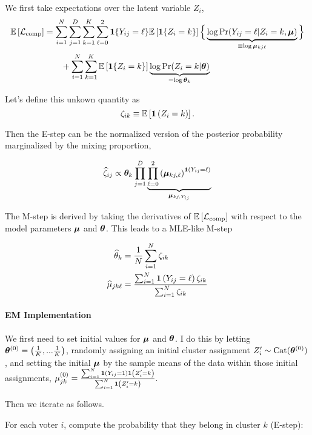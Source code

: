 \documentclass[11pt]{article}
\begin{document}
We first take expectations over the latent variable $Z_{i}$,
\begin{align}
\mathbb{E}\left[\mathcal{L}_{\text{comp}}\right]
& = \sum^{N}_{i=1}\sum^{D}_{j=1}\sum^{K}_{k=1}\sum^{2}_{\ell = 0}
\bm{1}\{Y_{ij} = \ell\} \mathbb{E}\left[\bm{1}\{Z_{i} = k\}\right]\Big\{
\underbrace{\log \Pr(Y_{ij} = \ell | Z_{i} = k, \bm{\mu})}_{\equiv \log\bm{\mu}_{kj\ell}}
\Big\} \nonumber\\
& \qquad +
\sum^{N}_{i=1}\sum^{K}_{k=1}\mathbb{E}\left[\bm{1}\{Z_{i} = k\}\right]\underbrace{\log \Pr(Z_{i} = k | \bm{\theta})}_{= \log \bm{\theta}_{k}}
\end{align}

 Let's define this unkown quantity as 
\[\zeta_{ik} \equiv \mathbb{E}\left[\bm{1}\left(Z_i = k\right)\right].\]

Then the E-step can be the normalized version of the posterior probability marginalized by the mixing proportion,

\begin{align}
\widehat{\zeta}_{ij} \propto \bm{\theta}_k\prod^D_{j = 1}\underbrace{\prod^{2}_{\ell = 0}\left(\bm{\mu}_{kj,\ell}\right)^{\bm{1}\left(Y_{ij} = \ell\right)}}_{\bm{\mu}_{kj, Y_{ij}}}
\end{align}

The M-step is derived by taking the derivatives of \(\mathbb{E}\left[\mathcal{L}_{\text{comp}}\right]\) with respect to the model parameters \(\bm{\mu}\) and \(\bm{\theta}\). This leads to a MLE-like M-step

\begin{align}
\widehat{\theta}_{k} &= \frac{1}{N}\sum^N_{i = 1}\zeta_{ik}\\
\widehat{\mu}_{jk\ell} &= \frac{\sum^N_{i=1}\bm{1}\left(Y_{ij} = \ell\right)\zeta_{ik}}{\sum^{N}_{i=1}\zeta_{ik}}
\end{align}


\paragraph{EM Implementation} We first need to set initial values for \(\bm{\mu}\) and \(\bm{\theta}\). I do this by letting \(\bm{\theta}^{(0)} = \left(\frac{1}{K},...\frac{1}{K}\right)\), randomly assigning an initial cluster assignment \(Z_i^\prime \sim \text{Cat}(\bm{\theta}^{(0)})\), and setting the initial \(\bm{\mu}\) by the sample means of the data within those initial assignments, \(\mu_{jk}^{(0)} = \frac{\sum_{i=1}^{N}\bm{1}\left(Y_{ij} = 1\right)\bm{1}\left(Z_{i}^{\prime} = k\right)}{\sum_{i=1}^{N}\bm{1}\left(Z_{i}^{\prime} = k\right)}.\) 

Then we iterate as follows. 

For each voter \(i\), compute the probability that they belong in cluster \(k\) (E-step):
\end{document}
